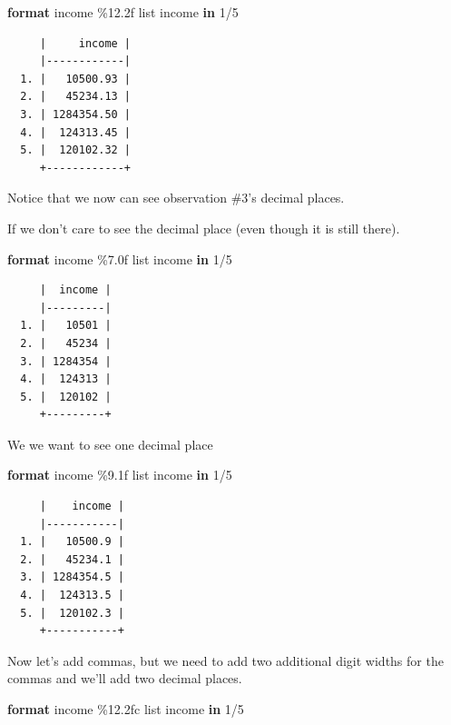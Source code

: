 \documentclass[
]{book}
\newenvironment{Shaded}{\begin{snugshade}}{\end{snugshade}}
\newcommand{\KeywordTok}[1]{\textcolor[rgb]{0.13,0.29,0.53}{\textbf{#1}}}
\newcommand{\NormalTok}[1]{#1}
\newcommand{\OtherTok}[1]{\textcolor[rgb]{0.56,0.35,0.01}{#1}}
\begin{document}
\begin{Shaded}
\begin{Highlighting}[]
\KeywordTok{format}\NormalTok{ income \%12.2f}
\OtherTok{list}\NormalTok{ income }\KeywordTok{in}\NormalTok{ 1/5}
\end{Highlighting}
\end{Shaded}

\begin{verbatim}
     |     income |
     |------------|
  1. |   10500.93 |
  2. |   45234.13 |
  3. | 1284354.50 |
  4. |  124313.45 |
  5. |  120102.32 |
     +------------+
\end{verbatim}

Notice that we now can see observation \#3's decimal places.

If we don't care to see the decimal place (even though it is still there).

\begin{Shaded}
\begin{Highlighting}[]
\KeywordTok{format}\NormalTok{ income \%7.0f}
\OtherTok{list}\NormalTok{ income }\KeywordTok{in}\NormalTok{ 1/5}
\end{Highlighting}
\end{Shaded}

\begin{verbatim}
     |  income |
     |---------|
  1. |   10501 |
  2. |   45234 |
  3. | 1284354 |
  4. |  124313 |
  5. |  120102 |
     +---------+
\end{verbatim}

We we want to see one decimal place

\begin{Shaded}
\begin{Highlighting}[]
\KeywordTok{format}\NormalTok{ income \%9.1f}
\OtherTok{list}\NormalTok{ income }\KeywordTok{in}\NormalTok{ 1/5}
\end{Highlighting}
\end{Shaded}

\begin{verbatim}
     |    income |
     |-----------|
  1. |   10500.9 |
  2. |   45234.1 |
  3. | 1284354.5 |
  4. |  124313.5 |
  5. |  120102.3 |
     +-----------+
\end{verbatim}

Now let's add commas, but we need to add two additional digit widths for the commas and we'll add two decimal places.

\begin{Shaded}
\begin{Highlighting}[]
\KeywordTok{format}\NormalTok{ income \%12.2fc}
\OtherTok{list}\NormalTok{ income }\KeywordTok{in}\NormalTok{ 1/5}
\end{Highlighting}
\end{Shaded}
\end{document}
